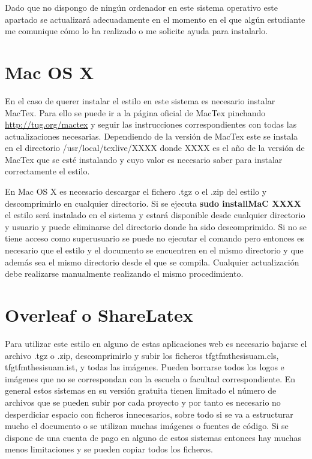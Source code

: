 Dado que no dispongo de ningún ordenador en este sistema operativo este apartado se actualizará adecuadamente en el momento en el que algún estudiante me comunique cómo lo ha realizado o me solicite ayuda para instalarlo.

\section{Mac OS X}

En el caso de querer instalar el estilo en este sistema es necesario instalar MacTex. Para ello se puede ir a la página oficial de MacTex pinchando \href{aquí}{http://tug.org/mactex} y seguir las instrucciones correspondientes con todas las actualizaciones necesarias. Dependiendo de la versión de MacTex este se instala en el directorio /usr/local/texlive/XXXX donde XXXX es el año de la versión de MacTex que se esté instalando y cuyo valor es necesario saber para instalar correctamente el estilo.

En Mac OS X es necesario descargar el fichero .tgz o el .zip del estilo y descomprimirlo en cualquier directorio. Si se ejecuta \textbf{sudo installMaC XXXX} el estilo será instalado en el sistema y estará disponible desde cualquier directorio y usuario y puede eliminarse del directorio donde ha sido descomprimido. Si no se tiene acceso como superusuario se puede no ejecutar el comando pero entonces es necesario que el estilo y el documento se encuentren en el mismo directorio y que además sea el mismo directorio desde el que se compila. Cualquier actualización debe realizarse manualmente realizando el mismo procedimiento.

\section{Overleaf o ShareLatex}

Para utilizar este estilo en alguno de estas aplicaciones web es necesario bajarse el archivo .tgz o .zip, descomprimirlo y subir los ficheros tfgtfmthesisuam.cls, tfgtfmthesisuam.ist, y todas las imágenes. Pueden borrarse todos los logos e imágenes que no se correspondan con la escuela o facultad correspondiente. En general estos sistemas en su versión gratuita tienen limitado el número de archivos que se pueden subir por cada proyecto y por tanto es necesario no desperdiciar espacio con ficheros innecesarios, sobre todo si se va a estructurar mucho el documento o se utilizan muchas imágenes o fuentes de código. Si se dispone de una cuenta de pago en alguno de estos sistemas entonces hay muchas menos limitaciones y se pueden copiar todos los ficheros.

